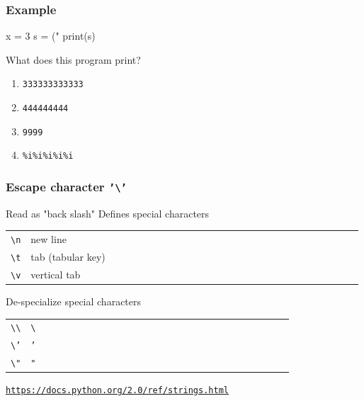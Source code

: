 \documentclass[11pt]{beamer}
\begin{document}
\begin{frame}[fragile]
  \frametitle{Example}
  \Enlarge

  \begin{semiverbatim}
x = 3
s = ("%
print(s)
  \end{semiverbatim}

  What does this program print?
  \begin{enumerate}[label=\Alph*]
  \item  \texttt{333333333333}
  \item  \texttt{444444444}
  \item  \texttt{9999}
  \item  \texttt{\%i\%i\%i\%i\%i}
  \end{enumerate}
\end{frame}


\begin{frame}
  \frametitle{Escape character \texttt{'\textbackslash'}}
  \Enlarge

  \begin{itemize}
  \myitem Read as "back slash"
  \myitem  Defines special characters
  
    \begin{tabular}{*{27}{l}}
      \texttt{\textbackslash n} & new line \\
      \texttt{\textbackslash t} & tab (tabular key)\\
      \texttt{\textbackslash v} & vertical tab \\
   \end{tabular} \pause
  \myitem De-specialize special characters \pause
  
    \begin{tabular}{*{27}{l}}
      \texttt{\textbackslash \textbackslash} & \texttt{\textbackslash} \\
      \texttt{\textbackslash '} & \texttt{'} \\
      \texttt{\textbackslash "} & \texttt{"} \\
   \end{tabular} 
 \end{itemize} \pause
  
  \hspace{7mm} \textcolor{blue}{\small \texttt{\url{https://docs.python.org/2.0/ref/strings.html}}} 
\end{frame}
\end{document}
